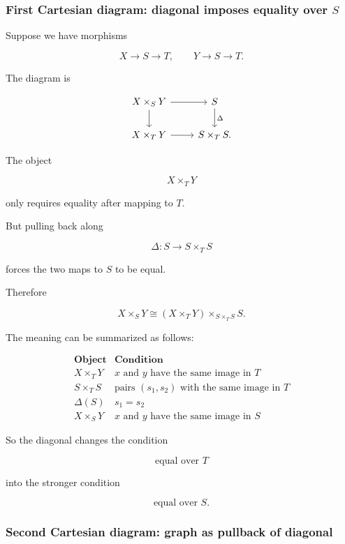 \documentclass[12pt,a4paper]{article}
\theoremstyle{notespace}
\begin{document}
\subsubsection{First Cartesian diagram: diagonal imposes equality over \(S\)}

Suppose we have morphisms

\[
X\to S\to T,
\qquad
Y\to S\to T.
\]

The diagram is

\[
\begin{tikzcd}
	X\times_S Y \arrow[r] \arrow[d]
	&
	S \arrow[d,"\Delta"]
	\\
	X\times_T Y \arrow[r]
	&
	S\times_T S.
\end{tikzcd}
\]

The object

\[
X\times_T Y
\]

only requires equality after mapping to \(T\).

But pulling back along

\[
\Delta:S\to S\times_T S
\]

forces the two maps to \(S\) to be equal.

Therefore

\[
X\times_S Y
\cong
(X\times_T Y)\times_{S\times_T S}S.
\]

The meaning can be summarized as follows:

\[
\begin{array}{c|c}
	\textbf{Object} & \textbf{Condition} \\
	\hline
	X\times_T Y
	&
	x\text{ and }y\text{ have the same image in }T
	\\
	\hline
	S\times_T S
	&
	\text{pairs }(s_1,s_2)\text{ with the same image in }T
	\\
	\hline
	\Delta(S)
	&
	s_1=s_2
	\\
	\hline
	X\times_S Y
	&
	x\text{ and }y\text{ have the same image in }S
\end{array}
\]

So the diagonal changes the condition

\[
\text{equal over }T
\]

into the stronger condition

\[
\text{equal over }S.
\]

\subsubsection{Second Cartesian diagram: graph as pullback of diagonal}
\end{document}

